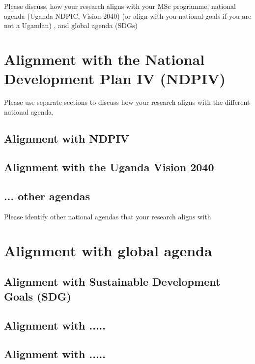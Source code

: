 Please discuss, how your research aligns with your MSc programme, national agenda (Uganda NDPIC, Vision 2040) (or align with you national goals if you are not a Ugandan) , and global agenda (SDGs)




\section{Alignment with the National Development Plan IV (NDPIV)}
Please use separate sections to discuss how your research aligns with the different national agenda, 

\subsection{Alignment with NDPIV}


\subsection{Alignment with the Uganda Vision 2040}

\subsection{ ... other agendas}
Please identify other national agendas that your research aligns with


\section{Alignment with global agenda}
    


\subsection{Alignment with Sustainable Development Goals (SDG) }
\subsection{Alignment with  .....  }
\subsection{Alignment with  .....  }


